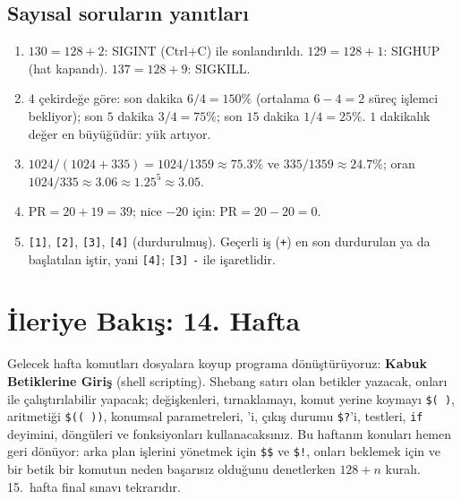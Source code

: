 \subsection*{Sayısal soruların yanıtları}
\begin{enumerate}[leftmargin=1.6em,start=7]
  \item $130 = 128 + 2$: SIGINT (Ctrl+C) ile sonlandırıldı. $129 = 128 + 1$: SIGHUP (hat kapandı). $137 = 128 + 9$: SIGKILL.
  \item $4$ çekirdeğe göre: son dakika $6/4 = 150\%$ (ortalama $6 - 4 = 2$ süreç işlemci bekliyor); son $5$ dakika $3/4 = 75\%$; son $15$ dakika $1/4 = 25\%$. $1$ dakikalık değer en büyüğüdür: yük artıyor.
  \item $1024/(1024 + 335) = 1024/1359 \approx 75.3\%$ ve $335/1359 \approx 24.7\%$; oran $1024/335 \approx 3.06 \approx 1.25^{5} \approx 3.05$.
  \item $\text{PR} = 20 + 19 = 39$; nice $-20$ için: $\text{PR} = 20 - 20 = 0$.
  \item {} \texttt{[1]},  \texttt{[2]},  \texttt{[3]},  \texttt{[4]} (durdurulmuş). Geçerli iş (\texttt{+}) en son durdurulan ya da başlatılan iştir, yani \texttt{[4]}; \texttt{[3]} \texttt{-} ile işaretlidir.
\end{enumerate}

\section{İleriye Bakış: 14. Hafta}

Gelecek hafta komutları dosyalara koyup programa dönüştürüyoruz: \textbf{Kabuk Betiklerine Giriş} (shell scripting). Shebang satırı olan betikler yazacak, onları  ile çalıştırılabilir yapacak; değişkenleri, tırnaklamayı, komut yerine koymayı \verb|$( )|, aritmetiği \verb|$(( ))|, konumsal parametreleri, 'i, çıkış durumu \verb|$?|'i, testleri, \texttt{if} deyimini, döngüleri ve fonksiyonları kullanacaksınız. Bu haftanın konuları hemen geri dönüyor: arka plan işlerini yönetmek için \verb|$$| ve \verb|$!|, onları beklemek için  ve bir betik bir komutun neden başarısız olduğunu denetlerken $128 + n$ kuralı. 15.~hafta final sınavı tekrarıdır.


